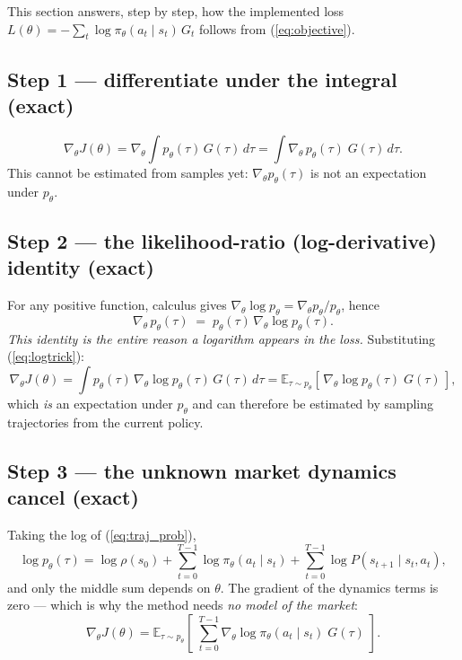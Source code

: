 This section answers, step by step, how the implemented loss
$L(\theta) = -\sum_t \log \pi_\theta(a_t\mid s_t)\, G_t$ follows from
(\ref{eq:objective}).

\subsection{Step 1 --- differentiate under the integral (exact)}

\begin{equation}
\nabla_\theta J(\theta)
= \nabla_\theta \!\int p_\theta(\tau)\, G(\tau)\, d\tau
= \int \nabla_\theta\, p_\theta(\tau)\; G(\tau)\, d\tau .
\end{equation}
This cannot be estimated from samples yet: $\nabla_\theta p_\theta(\tau)$
is not an expectation under $p_\theta$.

\subsection{Step 2 --- the likelihood-ratio (log-derivative) identity (exact)}

For any positive function, calculus gives
$\nabla_\theta \log p_\theta = \nabla_\theta p_\theta / p_\theta$, hence
\begin{equation}
\nabla_\theta\, p_\theta(\tau) \;=\; p_\theta(\tau)\,
\nabla_\theta \log p_\theta(\tau).
\label{eq:logtrick}
\end{equation}
\emph{This identity is the entire reason a logarithm appears in the loss.}
Substituting (\ref{eq:logtrick}):
\begin{equation}
\nabla_\theta J(\theta)
= \int p_\theta(\tau)\, \nabla_\theta \log p_\theta(\tau)\, G(\tau)\, d\tau
= \mathbb{E}_{\tau\sim p_\theta}\!\left[\,
   \nabla_\theta \log p_\theta(\tau)\; G(\tau) \,\right],
\end{equation}
which \emph{is} an expectation under $p_\theta$ and can therefore be
estimated by sampling trajectories from the current policy.

\subsection{Step 3 --- the unknown market dynamics cancel (exact)}

Taking the log of (\ref{eq:traj_prob}),
\[
\log p_\theta(\tau) = \log\rho(s_0)
 + \sum_{t=0}^{T-1}\log \pi_\theta(a_t\mid s_t)
 + \sum_{t=0}^{T-1}\log P(s_{t+1}\mid s_t,a_t),
\]
and only the middle sum depends on $\theta$. The gradient of the dynamics
terms is zero --- which is why the method needs \emph{no model of the
market}:
\begin{equation}
\nabla_\theta J(\theta)
= \mathbb{E}_{\tau\sim p_\theta}\!\left[\;
   \sum_{t=0}^{T-1} \nabla_\theta \log \pi_\theta(a_t \mid s_t)\;
   G(\tau) \;\right].
\label{eq:pg_full}
\end{equation}

